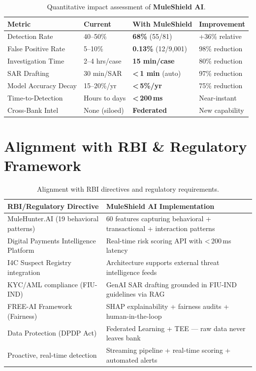 \documentclass[11pt, a4paper]{article}
\newcommand{\muleshield}{\textbf{\textcolor{mainblue}{MuleShield AI}}}
\begin{document}
\begin{table}[H]
\centering
\small
{}
\begin{tabularx}{\textwidth}{L{4.2cm} L{3.5cm} L{3.8cm} Y}
\toprule
{}
\textbf{Metric} & \textbf{Current} & \textbf{With MuleShield} & \textbf{Improvement} \\
\midrule
Detection Rate & 40--50\% & \textbf{68\%} (55/81) & +36\% relative \\
False Positive Rate & 5--10\% & \textbf{0.13\%} (12/9,001) & 98\% reduction \\
Investigation Time & 2--4 hrs/case & \textbf{15 min/case} & 80\% reduction \\
SAR Drafting & 30 min/SAR & \textbf{{<}\,1 min} (auto) & 97\% reduction \\
Model Accuracy Decay & 15--20\%/yr & \textbf{{<}\,5\%/yr} & 75\% reduction \\
Time-to-Detection & Hours to days & \textbf{{<}\,200\,ms} & Near-instant \\
Cross-Bank Intel & None (siloed) & \textbf{Federated} & New capability \\
\bottomrule
\end{tabularx}
\caption{Quantitative impact assessment of \muleshield{}.}
\end{table}


\section{Alignment with RBI \& Regulatory Framework}

\begin{table}[H]
\centering
\small
{}
\begin{tabularx}{\textwidth}{L{5.5cm} Y}
\toprule
{}
\textbf{RBI/Regulatory Directive} & \textbf{MuleShield AI Implementation} \\
\midrule
MuleHunter.AI (19 behavioral patterns) & 60 features capturing behavioral + transactional + interaction patterns \\
Digital Payments Intelligence Platform & Real-time risk scoring API with {<}\,200\,ms latency \\
I4C Suspect Registry integration & Architecture supports external threat intelligence feeds \\
KYC/AML compliance (FIU-IND) & GenAI SAR drafting grounded in FIU-IND guidelines via RAG \\
FREE-AI Framework (Fairness) & SHAP explainability + fairness audits + human-in-the-loop \\
Data Protection (DPDP Act) & Federated Learning + TEE --- raw data never leaves bank \\
Proactive, real-time detection & Streaming pipeline + real-time scoring + automated alerts \\
\bottomrule
\end{tabularx}
\caption{Alignment with RBI directives and regulatory requirements.}
\end{table}
\end{document}
